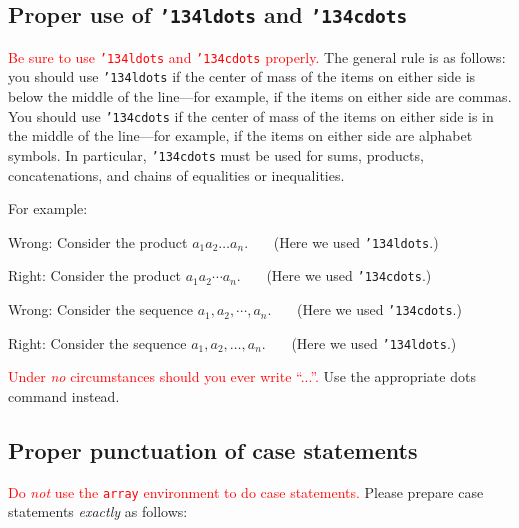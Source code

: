 \documentclass[12pt]{article}
\begin{document}
\subsection{Proper use of {\tt\char'134ldots} and {\tt\char'134cdots}}

     \textcolor{red}{Be sure to use {\tt\char'134ldots} and {\tt\char'134cdots} properly.}
The general rule is as follows:  you should use {\tt\char'134ldots} if
the center of mass of the items on either side is below the middle of
the line---for example, if the items on either side are commas.  You
should use {\tt \char'134cdots} if the center of mass of the items on
either side is in the middle of the line---for example, if the items
on either side are alphabet symbols.  In particular, {\tt \char'134cdots}
must be used for sums, products, concatenations, and chains of equalities
or inequalities.

For example:

\medskip

Wrong:  Consider the product $a_1 a_2 \ldots a_n$.  \ \ \   (Here we used {\tt \char'134ldots}.)

Right:  Consider the product $a_1 a_2 \cdots a_n$.  \ \ \    (Here we used {\tt \char'134cdots}.)

\bigskip

Wrong:  Consider the sequence $a_1, a_2, \cdots, a_n$.  \ \ \   (Here we used {\tt \char'134cdots}.)

Right:  Consider the sequence $a_1, a_2, \ldots, a_n$.  \ \ \   (Here we used {\tt \char'134ldots}.)

\bigskip

\textcolor{red}{Under {\it no\/}
circumstances should you ever write ``...''.}  Use the appropriate
dots command instead.

\subsection{Proper punctuation of case statements}

\textcolor{red}{Do {\it not\/} use the {\tt array} environment to do case statements.}  
Please prepare case statements {\it exactly\/} as follows:
\medskip

\end{document}
